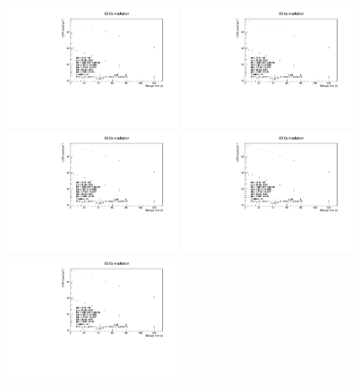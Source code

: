\documentclass[10pt,letterpaper]{article}
\begin{document}
\begin{figure}
\centering
\includegraphics[width=0.45\textwidth,page=2]{../storagelifetime/combinedfit.pdf}
\includegraphics[width=0.45\textwidth,page=3]{../storagelifetime/combinedfit.pdf}
\includegraphics[width=0.45\textwidth,page=4]{../storagelifetime/combinedfit.pdf}
\includegraphics[width=0.45\textwidth,page=5]{../storagelifetime/combinedfit.pdf}
\includegraphics[width=0.45\textwidth,page=6]{../storagelifetime/combinedfit.pdf}

\end{figure}
\end{document}
